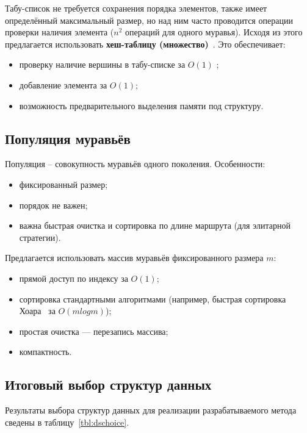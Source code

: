 Табу-список не требуется сохранения порядка элементов, также имеет определённый максимальный размер, но над ним часто проводится операции проверки наличия элемента ($n^2$ операций для одного муравья). Исходя из этого предлагается использовать \textbf{хеш-таблицу (множество)}~\cite{virt}. Это обеспечивает:

\begin{itemize}
	\item проверку наличие вершины в табу-списке за $O(1)$ ;
	\item добавление элемента за $O(1)$;
	\item возможность предварительного выделения памяти под структуру.
\end{itemize}

\subsection{Популяция муравьёв}

Популяция -- совокупность муравьёв одного поколения. Особенности:
\begin{itemize}
	\item фиксированный размер;
	\item порядок не важен;
	\item важна быстрая очистка и сортировка по длине маршрута (для элитарной стратегии).
\end{itemize}

Предлагается использовать массив муравьёв фиксированного размера $m$:
\begin{itemize}
	\item прямой доступ по индексу за $O(1)$;
	\item сортировка стандартными алгоритмами (например, быстрая сортировка Хоара~\cite{virt} за $O(mlogm)$);
	\item простая очистка — перезапись массива;
	\item компактность.
\end{itemize}

\subsection{Итоговый выбор структур данных}

Результаты выбора структур данных для реализации разрабатываемого метода сведены в таблицу~\ref{tbl:dschoice}.

